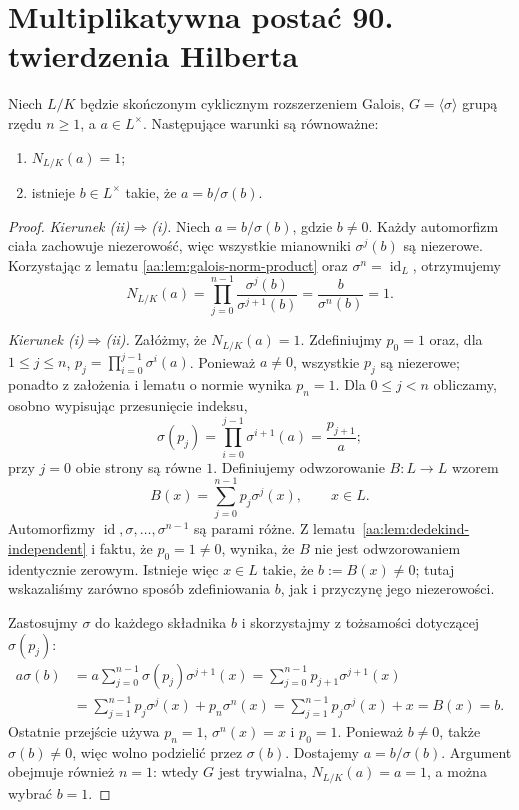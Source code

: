 \section{Multiplikatywna postać 90. twierdzenia Hilberta}
\begin{twierdzenie}\label{aa:tw:hilbert90-multiplicative}
Niech $L/K$ będzie skończonym cyklicznym rozszerzeniem Galois,
$G=\langle\sigma\rangle$ grupą rzędu $n\geq1$, a $a\in L^\times$.
Następujące warunki są równoważne:
\begin{enumerate}[label=\textup{(\roman*)}]
\item $N_{L/K}(a)=1$;
\item istnieje $b\in L^\times$ takie, że $a=b/\sigma(b)$.
\end{enumerate}
\end{twierdzenie}
\begin{proof}
\emph{Kierunek (ii)$\Rightarrow$(i).}
Niech $a=b/\sigma(b)$, gdzie $b\neq0$. Każdy automorfizm
ciała zachowuje niezerowość, więc wszystkie mianowniki
$\sigma^j(b)$ są niezerowe. Korzystając z lematu
\ref{aa:lem:galois-norm-product} oraz $\sigma^n=\operatorname{id}_L$,
otrzymujemy
\[
N_{L/K}(a)=\prod_{j=0}^{n-1}\frac{\sigma^j(b)}{\sigma^{j+1}(b)}
=\frac{b}{\sigma^n(b)}=1.
\]

\emph{Kierunek (i)$\Rightarrow$(ii).}
Załóżmy, że $N_{L/K}(a)=1$. Zdefiniujmy
$ p_0=1$ oraz, dla $1\leq j\leq n$,
$ p_j=\prod_{i=0}^{j-1}\sigma^i(a)$.
Ponieważ $a\neq0$, wszystkie $p_j$ są niezerowe;
ponadto z założenia i lematu o normie wynika $p_n=1$.
Dla $0\leq j<n$ obliczamy, osobno wypisując przesunięcie indeksu,
\[
\sigma(p_j)=\prod_{i=0}^{j-1}\sigma^{i+1}(a)
=\frac{p_{j+1}}{a};
\]
przy $j=0$ obie strony są równe $1$. Definiujemy odwzorowanie
$B:L\to L$ wzorem
\[
B(x)=\sum_{j=0}^{n-1}p_j\sigma^j(x),\qquad x\in L.
\]
Automorfizmy $\operatorname{id},\sigma,\ldots,\sigma^{n-1}$
są parami różne. Z lematu~\ref{aa:lem:dedekind-independent}
i faktu, że $p_0=1\neq0$, wynika, że $B$ nie jest odwzorowaniem
identycznie zerowym. Istnieje więc $x\in L$ takie, że
$b:=B(x)\neq0$; tutaj wskazaliśmy zarówno sposób zdefiniowania
$b$, jak i przyczynę jego niezerowości.

Zastosujmy $\sigma$ do każdego składnika $b$ i skorzystajmy
z tożsamości dotyczącej $\sigma(p_j)$:
\[
\begin{aligned}
a\sigma(b)
&=a\sum_{j=0}^{n-1}\sigma(p_j)\sigma^{j+1}(x)
 =\sum_{j=0}^{n-1}p_{j+1}\sigma^{j+1}(x)\\
&=\sum_{j=1}^{n-1}p_j\sigma^j(x)
   +p_n\sigma^n(x)
 =\sum_{j=1}^{n-1}p_j\sigma^j(x)+x=B(x)=b.
\end{aligned}
\]
Ostatnie przejście używa $p_n=1$, $\sigma^n(x)=x$ i $p_0=1$.
Ponieważ $b\neq0$, także $\sigma(b)\neq0$, więc wolno podzielić
przez $\sigma(b)$. Dostajemy $a=b/\sigma(b)$.
Argument obejmuje również $n=1$: wtedy $G$ jest trywialna,
$N_{L/K}(a)=a=1$, a można wybrać $b=1$.
\end{proof}

